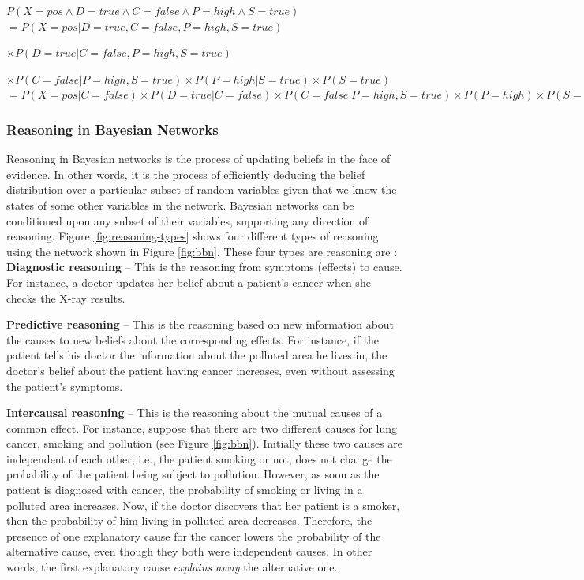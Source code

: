 \documentclass[11pt]{article}
\begin{document}
\begin{footnotesize}
\noindent $P(X= pos \wedge D = true \wedge C = false \wedge P = high \wedge S =
true)$\\

\noindent $= P(X= pos | D = true , C = false , P = high , S = true)$

\noindent $\times P(D = true | C = false , P = high , S = true)$

\noindent $\times P(C = false | P = high , S = true) \times P(P = high| S =
true) \times P(S = true)$\\

\noindent $= P(X= pos | C = false) \times P(D = true | C = false) \times P(C =
false | P = high , S = true) \times P(P = high) \times P(S = true)$
\end{footnotesize}

\subsubsection{Reasoning in Bayesian Networks}

Reasoning in Bayesian networks is the process of updating beliefs in the face of
evidence. In other words, it is the process of efficiently deducing the belief
distribution over a particular subset of random variables given that we know the
states of some other variables in the network. Bayesian networks can be
conditioned upon any subset of their variables, supporting any direction of
reasoning. Figure \ref{fig:reasoning-types} shows four different types of
reasoning using the network shown in Figure \ref{fig:bbn}. These four types are
reasoning are \cite{korb:bayesian-ai}:\\

\textbf{Diagnostic reasoning} -- This is the reasoning from symptoms (effects)
to cause. For instance, a doctor updates her belief about a patient's cancer
when she checks the X-ray results.

\textbf{Predictive reasoning} -- This is the reasoning based on new information
about the causes to new beliefs about the corresponding effects. For instance,
if the patient tells his doctor the information about the polluted area he
lives in, the doctor's belief about the patient having cancer increases, even
without assessing the patient's symptoms.

\textbf{Intercausal reasoning} -- This is the reasoning about the mutual causes
of a common effect. For instance,  suppose that there are two different causes
for lung cancer, smoking and pollution (see Figure \ref{fig:bbn}). Initially
these two causes are independent of each other; i.e., the patient smoking or
not, does not change the probability of the patient being subject to pollution.
However, as soon as the patient is diagnosed with cancer, the probability of
smoking or living in a polluted area increases. Now, if the doctor discovers
that her patient is a smoker, then the probability of him living in polluted
area decreases. Therefore, the presence of one explanatory cause for the cancer
lowers the probability of the alternative cause, even though they both were
independent causes. In other words, the first explanatory cause \textit{explains
away} the alternative one.
\end{document}
